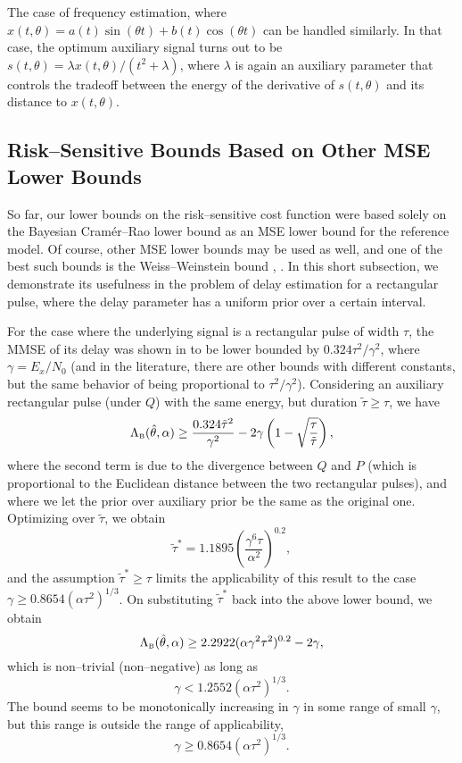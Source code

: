 \documentclass[11pt,epsf]{article}
\newcommand{\ct}{\hat{\theta}}
\begin{document}
The case of frequency estimation, where
$x(t,\theta)=a(t)\sin(\theta
t)+b(t)\cos(\theta t)$ can be handled similarly. In that case, 
the optimum auxiliary signal turns out to be
$s(t,\theta)=\lambda x(t,\theta)/(t^2+\lambda)$, where $\lambda$ is again an
auxiliary parameter that controls the tradeoff between the energy 
of the derivative of $s(t,\theta)$ and its distance to $x(t,\theta)$.

\subsection{Risk--Sensitive Bounds Based on Other MSE Lower Bounds}

So far, our lower bounds on the risk--sensitive cost function were based
solely on
the Bayesian Cram\'er--Rao lower bound as an MSE lower bound for the reference
model. Of course, other MSE lower bounds may be used as well, and one of the
best such bounds is the Weiss--Weinstein bound \cite{vantreesbell}, \cite{weissphd}.
In this short subsection, we demonstrate its
usefulness in the problem of delay estimation for a rectangular pulse, where the delay parameter has a
uniform prior over a certain interval.

For the case where the underlying signal is a
rectangular pulse of width $\tau$, the MMSE of its delay was shown
in \cite{weissphd} to be lower bounded by $0.324\tau^2/\gamma^2$,
where $\gamma=E_x/N_0$ (and in the literature, there are other bounds with different constants,
but the same behavior of being proportional to $\tau^2/\gamma^2$).
Considering an auxiliary rectangular pulse (under $Q$) with the
same energy, but duration $\tilde{\tau}\ge\tau$, we have
\begin{equation}
\Lambda_{\mbox{\tiny B}}(\ct,\alpha)\ge
\frac{0.324\tilde{\tau}^2}{\gamma^2}-2\gamma\left(1-\sqrt{\frac{\tau}{\tilde{\tau}}}\right),
\end{equation}
where the second term is due to the divergence between $Q$ and $P$ (which is
proportional to the Euclidean distance between the two rectangular pulses), and 
where we let the prior over auxiliary prior be the same as
the original one.
Optimizing over $\tilde{\tau}$, we obtain
\begin{equation}
\tilde{\tau}^*=1.1895\left(\frac{\gamma^6\tau}{\alpha^2}\right)^{0.2},
\end{equation}
and the assumption $\tilde{\tau}^*\ge\tau$ limits the applicability of this
result to the case $\gamma\ge 0.8654(\alpha\tau^2)^{1/3}$. On substituting
$\tilde{\tau}^*$ back into the above lower bound, we obtain
\begin{equation}
\Lambda_{\mbox{\tiny B}}(\ct,\alpha)\ge
2.2922(\alpha\gamma^2\tau^2)^{0.2}-2\gamma,
\end{equation}
which is non--trivial (non--negative) as long as 
\begin{equation}
\gamma < 1.2552
(\alpha\tau^2)^{1/3}. 
\end{equation}
The bound seems to be monotonically increasing in $\gamma$
in some range of small $\gamma$, but this range is outside the range of
applicability, 
\begin{equation}
\gamma\ge 0.8654(\alpha\tau^2)^{1/3}.
\end{equation}
\end{document}
